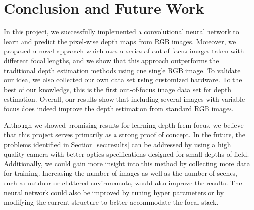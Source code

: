 \documentclass[letterpaper, 10 pt, conference]{ieeeconf}  %
\begin{document}
\section{Conclusion and Future Work}
\label{sec:conclusion}

In this project, we successfully implemented a convolutional neural network to learn and predict the pixel-wise depth maps from RGB images. Moreover, we proposed a novel approach which uses a series of out-of-focus images taken with different focal lengths, and we show that this approach outperforms the traditional depth estimation methods using one single RGB image. To validate our idea, we also collected our own data set using customized hardware. To the best of our knowledge, this is the first out-of-focus image data set for depth estimation. Overall, our results show that including several images with variable focus does indeed improve the depth estimation from standard RGB images. 

Although we showed promising results for learning depth from focus, we believe that this project serves primarily as a strong proof of concept. In the future, the problems identified in Section \ref{sec:results} can be addressed by using a high quality camera with better optics specifications designed for small depths-of-field. Additionally, we could gain more insight into this method by collecting more data for training. Increasing the number of images as well as the number of scenes, such as outdoor or cluttered environments, would also improve the results. The neural network could also be improved by tuning hyper parameters or by modifying the current structure to better accommodate the focal stack. 
\end{document}
